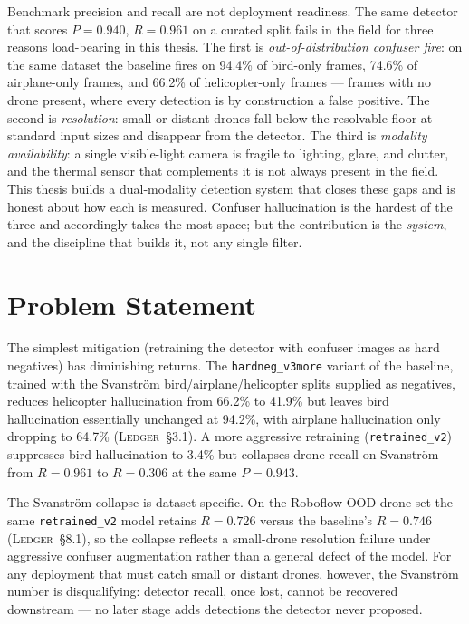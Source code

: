 Benchmark precision and recall are not deployment readiness. The same detector that scores $P=0.940$, $R=0.961$ on a curated split fails in the field for three reasons load-bearing in this thesis. The first is \emph{out-of-distribution confuser fire}: on the same dataset the baseline fires on 94.4\% of bird-only frames, 74.6\% of airplane-only frames, and 66.2\% of helicopter-only frames --- frames with no drone present, where every detection is by construction a false positive. The second is \emph{resolution}: small or distant drones fall below the resolvable floor at standard input sizes and disappear from the detector. The third is \emph{modality availability}: a single visible-light camera is fragile to lighting, glare, and clutter, and the thermal sensor that complements it is not always present in the field. This thesis builds a dual-modality detection system that closes these gaps and is honest about how each is measured. Confuser hallucination is the hardest of the three and accordingly takes the most space; but the contribution is the \emph{system}, and the discipline that builds it, not any single filter.

\section{Problem Statement}

The simplest mitigation (retraining the detector with confuser images as hard negatives) has diminishing returns. The \texttt{hardneg\_v3more} variant of the baseline, trained with the Svanstr\"om bird/airplane/helicopter splits supplied as negatives, reduces helicopter hallucination from 66.2\% to 41.9\% but leaves bird hallucination essentially unchanged at 94.2\%, with airplane hallucination only dropping to 64.7\% (\textsc{Ledger}~\S3.1). A more aggressive retraining (\texttt{retrained\_v2}) suppresses bird hallucination to 3.4\% but collapses drone recall on Svanstr\"om from $R=0.961$ to $R=0.306$ at the same $P=0.943$.

The Svanstr\"om collapse is dataset-specific. On the Roboflow OOD drone set the same \texttt{retrained\_v2} model retains $R=0.726$ versus the baseline's $R=0.746$ (\textsc{Ledger}~\S8.1), so the collapse reflects a small-drone resolution failure under aggressive confuser augmentation rather than a general defect of the model. For any deployment that must catch small or distant drones, however, the Svanstr\"om number is disqualifying: detector recall, once lost, cannot be recovered downstream --- no later stage adds detections the detector never proposed.

